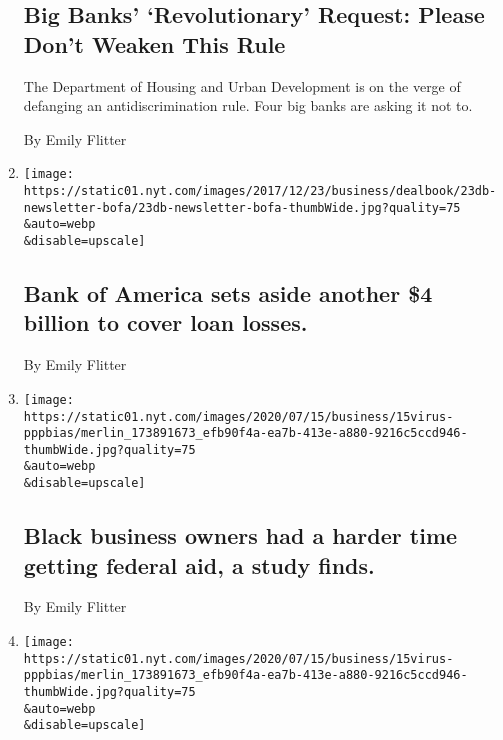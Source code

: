 \begin{enumerate}
{  \subsection{Big Banks' `Revolutionary' Request: Please Don't Weaken
  This
  Rule}\label{big-banks-revolutionary-request-please-dont-weaken-this-rule}}

  The Department of Housing and Urban Development is on the verge of
  defanging an antidiscrimination rule. Four big banks are asking it not
  to.

  By Emily Flitter
\item
  \href{/2020/07/16/business/bank-of-america-sets-aside-another-4-billion-to-cover-loan-losses.html}{}

  \texttt{[image: https://static01.nyt.com/images/2017/12/23/business/dealbook/23db-newsletter-bofa/23db-newsletter-bofa-thumbWide.jpg?quality=75\\\&auto=webp\\\&disable=upscale]}

  \hypertarget{bank-of-america-sets-aside-another-4-billion-to-cover-loan-losses}{%
  \subsection{Bank of America sets aside another \$4 billion to cover
  loan
  losses.}\label{bank-of-america-sets-aside-another-4-billion-to-cover-loan-losses}}

  By Emily Flitter
\item
  \href{/live/2020/07/15/business/stock-market-today-coronavirus/black-business-owners-had-a-harder-time-getting-federal-aid-a-study-finds}{}

  \texttt{[image: https://static01.nyt.com/images/2020/07/15/business/15virus-pppbias/merlin\_173891673\_efb90f4a-ea7b-413e-a880-9216c5ccd946-thumbWide.jpg?quality=75\\\&auto=webp\\\&disable=upscale]}

  \hypertarget{black-business-owners-had-a-harder-time-getting-federal-aid-a-study-finds}{%
  \subsection{Black business owners had a harder time getting federal
  aid, a study
  finds.}\label{black-business-owners-had-a-harder-time-getting-federal-aid-a-study-finds}}

  By Emily Flitter
\item
  \href{/2020/07/15/business/paycheck-protection-program-bias.html}{}

  \texttt{[image: https://static01.nyt.com/images/2020/07/15/business/15virus-pppbias/merlin\_173891673\_efb90f4a-ea7b-413e-a880-9216c5ccd946-thumbWide.jpg?quality=75\\\&auto=webp\\\&disable=upscale]}


\end{enumerate}
